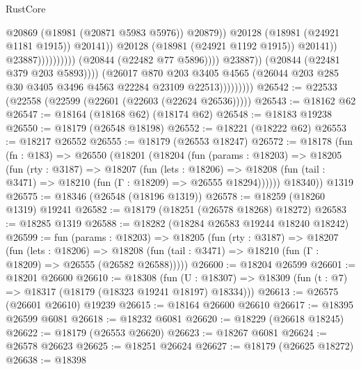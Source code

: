 \begin{lexlean}{RustCore}
\begin{coremodule}
                                                              @20869
                                                              (@18981 (@20871 @5983 @5976))
                                                              @20879))
                                                          @20128
                                                          (@18981 (@24921 @1181 @1915))
                                                          @20141))
                                                      @20128
                                                      (@18981 (@24921 @1192 @1915))
                                                      @20141))
                                                  @23887))))))))))
                              (@20844 (@22482 @77 @5896))))
                          @23887))
                      (@20844 (@22481 @379 @203 @5893))))
                  (@26017
                    @870
                    @203
                    @3405
                    @4565
                    (@26044 @203 @285 @30 @3405 @3496 @4563 @22284 @23109 @22513)))))))))
@26542 := @22533 (@22558 (@22599 (@22601 (@22603 (@22624 @26536)))))
@26543 := @18162 @62
@26547 := @18164 (@18168 @62) (@18174 @62)
@26548 := @18183 @19238
@26550 := @18179 (@26548 @18198)
@26552 := @18221 (@18222 @62)
@26553 := @18217 @26552
@26555 := @18179 (@26553 @18247)
@26572 := @18178
    (fun (fn : @183) =>
    @26550
      (@18201
        (@18204
          (fun (params : @18203) =>
          @18205
            (fun (rty : @3187) =>
            @18207
              (fun (lets : @18206) =>
              @18208 (fun (tail : @3471) => @18210 (fun (Γ : @18209) => @26555 @18294))))))
        @18340))
    @1319
@26575 := @18346 (@26548 (@18196 @1319))
@26578 := @18259 (@18260 @1319) @19241
@26582 := @18179 (@18251 (@26578 @18268) @18272)
@26583 := @18285 @1319
@26588 := @18282 (@18284 @26583 @19244 @18240 @18242)
@26599 := fun (params : @18203) =>
  @18205
    (fun (rty : @3187) =>
    @18207
      (fun (lets : @18206) =>
      @18208 (fun (tail : @3471) => @18210 (fun (Γ : @18209) => @26555 (@26582 @26588)))))
@26600 := @18204 @26599
@26601 := @18201 @26600
@26610 := @18308
    (fun (U : @18307) => @18309 (fun (t : @7) => @18317 (@18179 (@18323 @19241 @18197) @18334)))
@26613 := @26575 (@26601 @26610) @19239
@26615 := @18164 @26600 @26610
@26617 := @18395 @26599 @6081
@26618 := @18232 @6081
@26620 := @18229 (@26618 @18245)
@26622 := @18179 (@26553 @26620)
@26623 := @18267 @6081
@26624 := @26578 @26623
@26625 := @18251 @26624
@26627 := @18179 (@26625 @18272)
@26638 := @18398

\end{coremodule}
\end{lexlean}
